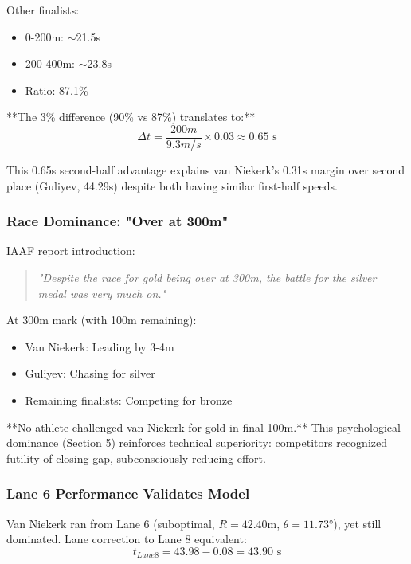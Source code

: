 Other finalists:
\begin{itemize}
    \item 0-200m: $\sim$21.5s
    \item 200-400m: $\sim$23.8s
    \item Ratio: 87.1\%
\end{itemize}

**The 3\% difference (90\% vs 87\%) translates to:**
\begin{equation}
\Delta t = \frac{200m}{9.3m/s} \times 0.03 \approx 0.65 \text{ s}
\end{equation}

This 0.65s second-half advantage explains van Niekerk's 0.31s margin over second place (Guliyev, 44.29s) despite both having similar first-half speeds.

\subsubsection{Race Dominance: "Over at 300m"}

IAAF report introduction:

\begin{quote}
\textit{"Despite the race for gold being over at 300m, the battle for the silver medal was very much on."}
\end{quote}

At 300m mark (with 100m remaining):
\begin{itemize}
    \item Van Niekerk: Leading by 3-4m
    \item Guliyev: Chasing for silver
    \item Remaining finalists: Competing for bronze
\end{itemize}

**No athlete challenged van Niekerk for gold in final 100m.** This psychological dominance (Section 5) reinforces technical superiority: competitors recognized futility of closing gap, subconsciously reducing effort.

\subsubsection{Lane 6 Performance Validates Model}

Van Niekerk ran from Lane 6 (suboptimal, $R = 42.40$m, $\theta = 11.73°$), yet still dominated. Lane correction to Lane 8 equivalent:
\begin{equation}
t_{Lane8} = 43.98 - 0.08 = 43.90 \text{ s}
\end{equation}

